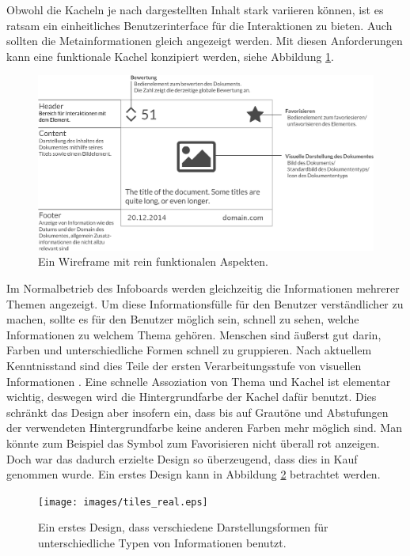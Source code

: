 \documentclass[12pt,twoside]{book}
\begin{document}
Obwohl die Kacheln je nach dargestellten Inhalt stark variieren können, ist es ratsam ein einheitliches Benutzerinterface für die Interaktionen zu bieten. Auch sollten die Metainformationen gleich angezeigt werden.
Mit diesen Anforderungen kann eine funktionale Kachel konzipiert werden, siehe Abbildung \ref{fig:tile_prototype}.

\begin{figure}[htbp]
    \centering
    \includegraphics[width=1.0\textwidth]{images/tiles.eps}
    \caption{Ein Wireframe mit rein funktionalen Aspekten.}
    \label{fig:tile_prototype}
\end{figure}

Im Normalbetrieb des Infoboards werden gleichzeitig die Informationen mehrerer Themen angezeigt. Um diese Informationsfülle für den Benutzer verständlicher zu machen, sollte es für den Benutzer möglich sein, schnell zu sehen, welche Informationen zu welchem Thema gehören.
Menschen sind äußerst gut darin, Farben und unterschiedliche Formen schnell zu gruppieren. Nach aktuellem Kenntnisstand sind dies Teile der ersten Verarbeitungsstufe von visuellen Informationen \citep{treisman1987merkmale}. Eine schnelle Assoziation von Thema und Kachel ist elementar wichtig, deswegen wird die Hintergrundfarbe der Kachel dafür benutzt. Dies schränkt das Design aber insofern ein, dass bis auf Grautöne und Abstufungen der verwendeten Hintergrundfarbe keine anderen Farben mehr möglich sind. Man könnte zum Beispiel das Symbol zum Favorisieren nicht überall rot anzeigen. Doch war das dadurch erzielte Design so überzeugend, dass dies in Kauf genommen wurde. Ein erstes Design kann in Abbildung \ref{fig:tile_design} betrachtet werden.

\begin{figure}[htbp]
    \centering
    \texttt{[image: images/tiles\_real.eps]}
    \caption{Ein erstes Design, dass verschiedene Darstellungsformen für unterschiedliche Typen von Informationen benutzt.}
    \label{fig:tile_design}
\end{figure}
\end{document}
